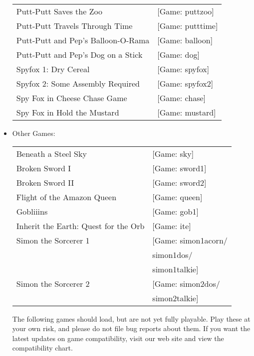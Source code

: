 \begin{itemize}
\begin{tabular}[h]{ll}
    Putt-Putt Saves the Zoo&                                       [Game: puttzoo]\\
    Putt-Putt Travels Through Time&                                [Game: putttime]\\
    Putt-Putt and Pep's Balloon-O-Rama&                            [Game: balloon]\\
    Putt-Putt and Pep's Dog on a Stick&                            [Game: dog]\\
    Spyfox 1: Dry Cereal&                                          [Game: spyfox]\\
    Spyfox 2: Some Assembly Required&                              [Game: spyfox2]\\
    Spy Fox in Cheese Chase Game&                                  [Game: chase]\\
    Spy Fox in Hold the Mustard&                                   [Game: mustard]\\
  \end{tabular}
\item Other Games:\\ 
  \begin{tabular}[h]{ll}
    Beneath a Steel Sky&                           [Game: sky]\\
    Broken Sword I&                                [Game: sword1]\\
    Broken Sword II&                               [Game: sword2]\\
    Flight of the Amazon Queen&                    [Game: queen]\\
    Gobliiins&                                     [Game: gob1]\\
    Inherit the Earth: Quest for the Orb&          [Game: ite]\\
     Simon the Sorcerer 1&                         [Game: simon1acorn/\\
     &                                                    simon1dos/\\
     &                                                    simon1talkie]\\
     Simon the Sorcerer 2&                         [Game: simon2dos/\\
     &                                                    simon2talkie]\\
  \end{tabular}

  The following games should load, but are not yet fully playable. Play these at your own risk, and please do not file bug reports about them. If you want
the latest updates on game compatibility, visit our web site and view the
compatibility chart.


\end{itemize}
